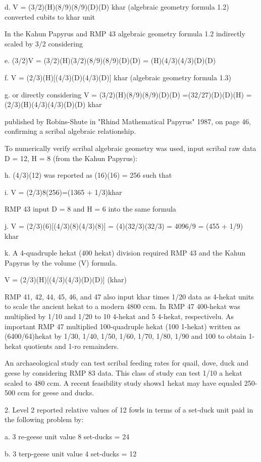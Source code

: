\documentclass[12pt]{article}
\begin{document}
d. V = (3/2)(H)(8/9)(8/9)(D)(D) khar (algebraic geometry formula 1.2) converted cubits to khar unit

In the Kahun Papyrus and RMP 43 algebraic geometry formula 1.2 indirectly scaled by 3/2 considering

e. (3/2)V = (3/2)(H)(3/2)(8/9)(8/9)(D)(D) = (H)(4/3)(4/3)(D)(D)

f. V = (2/3)(H)[(4/3)(D)(4/3)(D)] khar  (algebraic geometry formula 1.3)  

g. or directly considering V = (3/2)(H)(8/9)(8/9)(D)(D) =(32/27)(D)(D)(H) =(2/3)(H)(4/3)(4/3)(D)(D) khar

published by Robins-Shute in "Rhind Mathematical Papyrus" 1987, on page 46, confirming a scribal algebraic relationship.

To numerically verify scribal algebraic geometry was used, input scribal raw data D = 12, H = 8 (from the Kahun Papyrus):

h. (4/3)(12) was reported as (16)(16) = 256 such that

i. V = (2/3)8(256)=(1365 + 1/3)khar

RMP 43 input D = 8 and H = 6 into the same formula

j. V = (2/3)(6)[(4/3)(8)(4/3)(8)] = (4)(32/3)(32/3) = 4096/9 = (455 + 1/9) khar

k. A 4-quadruple hekat (400 hekat) division required RMP 43 and the Kahun Papyrus by the volume (V) formula.

V = (2/3)(H)[(4/3)(4/3)(D)(D)] (khar) 

RMP 41, 42, 44, 45, 46, and 47 also input khar times 1/20 data as 4-hekat units to scale the ancient hekat to a modern 4800 ccm. In RMP 47 400-hekat was multiplied by 1/10 and 1/20 to 10 4-hekat and 5 4-hekat, respectivelu. As important RMP 47 multiplied 100-quadruple hekat (100 1-hekat) written as (6400/64)hekat by 1/30, 1/40, 1/50, 1/60, 1/70, 1/80, 1/90 and 100 to obtain 1-hekat quotients and 1-ro remainders. 

An archaeological study can test scribal feeding rates for quail, dove, duck and geese by considering RMP 83 data. This class of study can test 1/10 a hekat scaled to 480 ccm. A recent feasibility study shows1 hekat may have equaled 250-500 ccm for geese and ducks. 

2. Level 2 reported relative values of 12 fowls in terms of a set-duck unit paid in the following problem by:

a. 3 re-geese unit value 8 set-ducks = 24

b. 3 terp-geese unit value 4 set-ducks = 12
\end{document}

